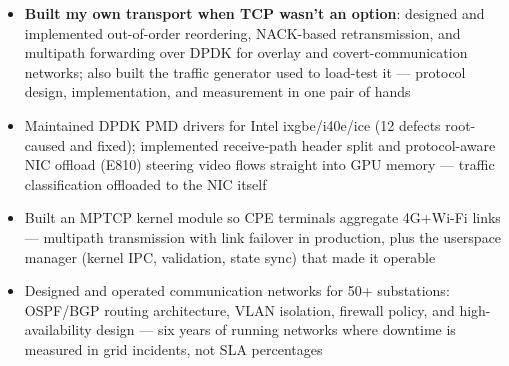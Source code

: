 \documentclass{resume}
\begin{document}
\begin{onehalfspacing}
\begin{itemize}
	\item \textbf{Built my own transport when TCP wasn't an option}: designed and implemented out-of-order reordering, NACK-based retransmission, and multipath forwarding over DPDK for overlay and covert-communication networks; also built the traffic generator used to load-test it --- protocol design, implementation, and measurement in one pair of hands
\end{itemize}
\end{onehalfspacing}

\begin{onehalfspacing}
\begin{itemize}
	\item Maintained DPDK PMD drivers for Intel ixgbe/i40e/ice (12 defects root-caused and fixed); implemented receive-path header split and protocol-aware NIC offload (E810) steering video flows straight into GPU memory --- traffic classification offloaded to the NIC itself
\end{itemize}
\end{onehalfspacing}

\begin{onehalfspacing}
\begin{itemize}
	\item Built an MPTCP kernel module so CPE terminals aggregate 4G+Wi-Fi links --- multipath transmission with link failover in production, plus the userspace manager (kernel IPC, validation, state sync) that made it operable
\end{itemize}
\end{onehalfspacing}

\begin{onehalfspacing}
\begin{itemize}
	\item Designed and operated communication networks for 50+ substations: OSPF/BGP routing architecture, VLAN isolation, firewall policy, and high-availability design --- six years of running networks where downtime is measured in grid incidents, not SLA percentages
\end{itemize}
\end{onehalfspacing}
\end{document}
